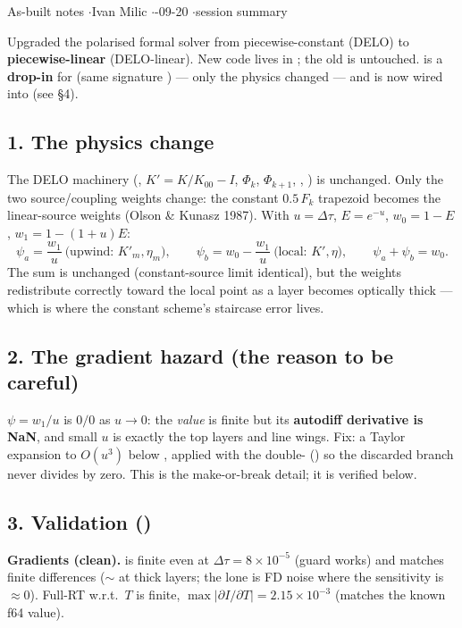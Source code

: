 


%
{As-built notes \quad$\cdot$\quad Ivan Milic \quad$\cdot$-09-20 \quad$\cdot$\quad session summary}

Upgraded the polarised formal solver from piecewise-constant (DELO) to \textbf{piecewise-linear}
(DELO-linear). New code lives in ; the old  is
untouched.  is a \textbf{drop-in} for  (same signature
) --- only the physics changed --- and is now wired into
 (see \S4).

\subsection*{1. The physics change}
The DELO machinery (, $K'=K/K_{00}-I$, $\Phi_k$, $\Phi_{k+1}$, ,
) is unchanged. Only the two source/coupling weights change: the constant
$0.5\,F_k$ trapezoid becomes the linear-source weights (Olson \& Kunasz 1987). With $u=\Delta\tau$,
$E=e^{-u}$, $w_0=1-E$, $w_1=1-(1+u)E$:
\[
\psi_a = \frac{w_1}{u}\ \text{(upwind: }K'_m,\eta_m),\qquad
\psi_b = w_0 - \frac{w_1}{u}\ \text{(local: }K',\eta),\qquad \psi_a+\psi_b = w_0 .
\]
The sum is unchanged (constant-source limit identical), but the weights redistribute correctly toward
the local point as a layer becomes optically thick --- which is where the constant scheme's staircase
error lives.

\subsection*{2. The gradient hazard (the reason to be careful)}
$\psi = w_1/u$ is $0/0$ as $u\to0$: the \emph{value} is finite but its \textbf{autodiff derivative is
NaN}, and small $u$ is exactly the top layers and line wings. Fix: a Taylor expansion to $O(u^3)$ below
, applied with the double- () so the discarded
branch never divides by zero. This is the make-or-break detail; it is verified below.

\subsection*{3. Validation ()}
\textbf{Gradients (clean).}  is finite even at $\Delta\tau=8\times10^{-5}$
(guard works) and matches finite differences ($\sim$ at thick layers; the lone 
is FD noise where the sensitivity is $\approx0$). Full-RT  w.r.t.\ $T$ is finite,
$\max|\partial I/\partial T|=2.15\times10^{-3}$ (matches the known f64 value).

